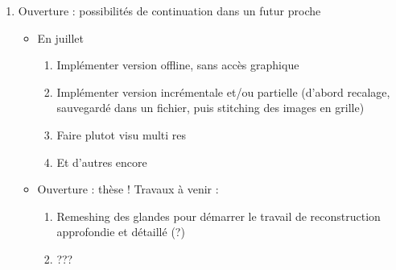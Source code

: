 {{\begin{enumerate}
\begin{itemize}
				\item problème perso : ne veut pas faire de petits pas, mais plutot un grand en + de tps
				\item ouverture : + de travail sur moi même \& ma facon de travailler (malheureusement, seule ouverture possible dans ce contexte)
			\end{itemize}
			\item Ouverture : possibilités de continuation dans un futur proche\begin{itemize}
				\item En juillet\begin{enumerate}
					\item Implémenter version offline, sans accès graphique
					\item Implémenter version incrémentale et/ou partielle (d'abord recalage, sauvegardé dans un fichier, puis stitching des images en grille)
					\item Faire plutot visu multi res
					\item Et d'autres encore
				\end{enumerate}
			\item Ouverture : thèse ! Travaux à venir :\begin{enumerate}
					\item Remeshing des glandes pour démarrer le travail de reconstruction approfondie et détaillé (?)
					\item ???
				\end{enumerate}
			\end{itemize}
		\end{enumerate}
	}

}
